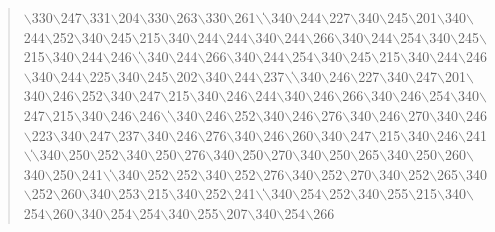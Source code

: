 \documentclass[11pt]{article}
\begin{document}
\begin{quote}
$\backslash$330$\backslash$247$\backslash$331$\backslash$204$\backslash$330$\backslash$263$\backslash$330$\backslash$261$\backslash$\|$\backslash$340$\backslash$244$\backslash$227$\backslash$340$\backslash$245$\backslash$201$\backslash$340$\backslash$244$\backslash$252$\backslash$340$\backslash$245$\backslash$215$\backslash$340$\backslash$244$\backslash$244$\backslash$340$\backslash$244$\backslash$266$\backslash$340$\backslash$244$\backslash$254$\backslash$340$\backslash$245$\backslash$215$\backslash$340$\backslash$244$\backslash$246$\backslash$\|$\backslash$340$\backslash$244$\backslash$266$\backslash$340$\backslash$244$\backslash$254$\backslash$340$\backslash$245$\backslash$215$\backslash$340$\backslash$244$\backslash$246$\backslash$340$\backslash$244$\backslash$225$\backslash$340$\backslash$245$\backslash$202$\backslash$340$\backslash$244$\backslash$237$\backslash$\|$\backslash$340$\backslash$246$\backslash$227$\backslash$340$\backslash$247$\backslash$201$\backslash$340$\backslash$246$\backslash$252$\backslash$340$\backslash$247$\backslash$215$\backslash$340$\backslash$246$\backslash$244$\backslash$340$\backslash$246$\backslash$266$\backslash$340$\backslash$246$\backslash$254$\backslash$340$\backslash$247$\backslash$215$\backslash$340$\backslash$246$\backslash$246$\backslash$\|$\backslash$340$\backslash$246$\backslash$252$\backslash$340$\backslash$246$\backslash$276$\backslash$340$\backslash$246$\backslash$270$\backslash$340$\backslash$246$\backslash$223$\backslash$340$\backslash$247$\backslash$237$\backslash$340$\backslash$246$\backslash$276$\backslash$340$\backslash$246$\backslash$260$\backslash$340$\backslash$247$\backslash$215$\backslash$340$\backslash$246$\backslash$241$\backslash$\|$\backslash$340$\backslash$250$\backslash$252$\backslash$340$\backslash$250$\backslash$276$\backslash$340$\backslash$250$\backslash$270$\backslash$340$\backslash$250$\backslash$265$\backslash$340$\backslash$250$\backslash$260$\backslash$340$\backslash$250$\backslash$241$\backslash$\|$\backslash$340$\backslash$252$\backslash$252$\backslash$340$\backslash$252$\backslash$276$\backslash$340$\backslash$252$\backslash$270$\backslash$340$\backslash$252$\backslash$265$\backslash$340$\backslash$252$\backslash$260$\backslash$340$\backslash$253$\backslash$215$\backslash$340$\backslash$252$\backslash$241$\backslash$\|$\backslash$340$\backslash$254$\backslash$252$\backslash$340$\backslash$255$\backslash$215$\backslash$340$\backslash$254$\backslash$260$\backslash$340$\backslash$254$\backslash$254$\backslash$340$\backslash$255$\backslash$207$\backslash$340$\backslash$254$\backslash$266 
\end{quote}
\end{document}
